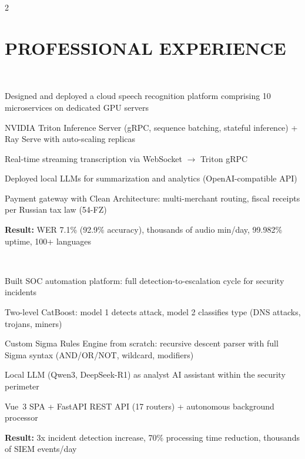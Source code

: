 \documentclass[]{deedy-resume-reversed}
\begin{document}
\begin{paracol}{2}


\section{PROFESSIONAL EXPERIENCE}

\\
\begin{tightemize}
\item Designed and deployed a cloud speech recognition platform comprising 10 microservices on dedicated GPU servers
\item NVIDIA Triton Inference Server (gRPC, sequence batching, stateful inference) + Ray Serve with auto-scaling replicas
\item Real-time streaming transcription via WebSocket $\rightarrow$ Triton gRPC
\item Deployed local LLMs for summarization and analytics (OpenAI-compatible API)
\item Payment gateway with Clean Architecture: multi-merchant routing, fiscal receipts per Russian tax law (54-FZ)
\item \textbf{Result:} WER 7.1\% (92.9\% accuracy), thousands of audio min/day, 99.982\% uptime, 100+ languages
\end{tightemize}
\sectionsep

\\
\begin{tightemize}
\item Built SOC automation platform: full detection-to-escalation cycle for security incidents
\item Two-level CatBoost: model 1 detects attack, model 2 classifies type (DNS attacks, trojans, miners)
\item Custom Sigma Rules Engine from scratch: recursive descent parser with full Sigma syntax (AND/OR/NOT, wildcard, modifiers)
\item Local LLM (Qwen3, DeepSeek-R1) as analyst AI assistant within the security perimeter
\item Vue~3 SPA + FastAPI REST API (17 routers) + autonomous background processor
\item \textbf{Result:} 3x incident detection increase, 70\% processing time reduction, thousands of SIEM events/day
\end{tightemize}
\sectionsep


\end{paracol}
\end{document}
